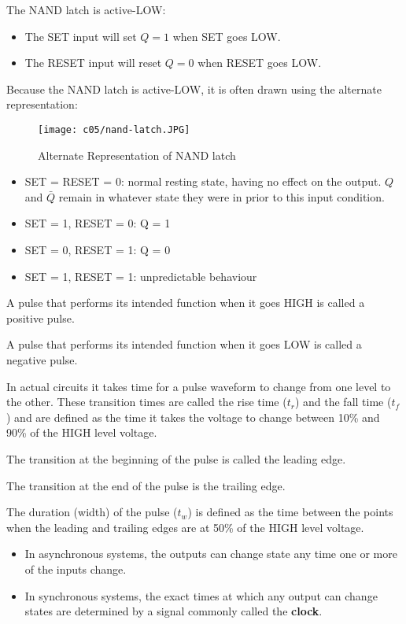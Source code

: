   \par The NAND latch is active-LOW:
  \begin{itemize}
    \item The SET input will set $Q = 1$ when SET goes LOW.
    \item The RESET input will reset $Q = 0$ when RESET goes LOW.
  \end{itemize}
  \par Because the NAND latch is active-LOW, it is often drawn using the alternate
  representation:
  \begin{figure}[H]
    \centering
    \texttt{[image: c05/nand-latch.JPG]}
    \caption{Alternate Representation of NAND latch}
  \end{figure}

  \begin{itemize}
    \item SET = RESET = 0: normal resting state, having no effect on the output.
    $Q$ and $\bar{Q}$ remain in whatever state they were in prior to this input
    condition.
    \item SET = 1, RESET = 0: Q = 1
    \item SET = 0, RESET = 1: Q = 0
    \item SET = 1, RESET = 1: unpredictable behaviour
  \end{itemize}

  \par A pulse that performs its intended function when it goes HIGH is called
  a positive pulse.
  \par A pulse that performs its intended function when it goes LOW is called
  a negative pulse.
  \par In actual circuits it takes time for a pulse waveform to change from one
  level to the other. These transition times are called the rise time ($t_{r}$) and
  the fall time ($t_{f}$) and are defined as the time it takes the voltage to change
  between 10\% and 90\% of the HIGH level voltage.
  \par The transition at the beginning of the pulse is called the leading edge.
  \par The transition at the end of the pulse is the trailing edge.
  \par The duration (width) of the pulse ($t_{w}$) is defined as the time between
  the points when the leading and trailing edges are at 50\% of the HIGH level voltage.

    \begin{itemize}
      \item In asynchronous systems, the outputs can change state any time one
        or more of the inputs change.
      \item In synchronous systems, the exact times at which any output can change
        states are determined by a signal commonly called the \textbf{clock}.
    \end{itemize}

